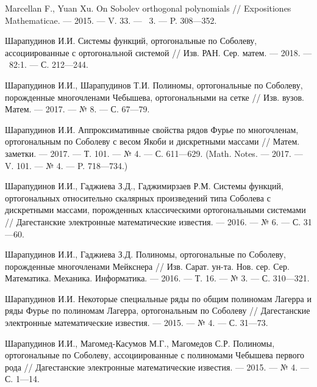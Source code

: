 ﻿\begin{thebibliography}{11}
Marcellan F., Yuan Xu. On Sobolev orthogonal polynomials // Expositiones Mathematicae. --- 2015. --- V. 33. --- \No\ 3. --- P. 308---352.



{Шарапудинов И.И.} Системы функций, ортогональные по Соболеву, ассоциированные с ортогональной системой // Изв. РАН. Сер. матем. --- 2018. --- \No\  82:1. --- С. 212---244.



Шарапудинов И.И., Шарапудинов Т.И. Полиномы, ортогональные по Соболеву, порожденные многочленами Чебышева, ортогональными на сетке // Изв. вузов. Матем. --- 2017. --- № 8. --- С. 67---79.



Шарапудинов И.И. Аппроксимативные свойства рядов Фурье по многочленам, ортогональным по Соболеву с весом Якоби и дискретными массами // Матем. заметки. --- 2017. --- Т. 101. --- № 4. --- С. 611---629. (Math. Notes. --- 2017. --- V. 101. --- № 4. --- P. 718---734.)



Шарапудинов И.И., Гаджиева З.Д., Гаджимирзаев Р.М. Системы функций, ортогональных относительно скалярных произведений типа Соболева с дискретными массами, порожденных классическими ортогональными системами // Дагестанские электронные математические известия. --- 2016. --- № 6. --- С. 31---60.



Шарапудинов И.И., Гаджиева З.Д. Полиномы, ортогональные по Соболеву, порожденные многочленами Мейкснера // Изв. Сарат. ун-та. Нов. сер. Сер. Математика. Механика. Информатика. --- 2016. --- Т. 16. --- № 3. --- С. 310---321.



Шарапудинов И.И. Некоторые специальные ряды по общим полиномам Лагерра и ряды Фурье по полиномам Лагерра, ортогональным по Соболеву // Дагестанские электронные математические известия. --- 2015. --- № 4. --- С. 31---73.



Шарапудинов И.И., Магомед-Касумов М.Г., Магомедов С.Р. Полиномы, ортогональные по Соболеву, ассоциированные с полиномами Чебышева первого рода // Дагестанские электронные математические известия. --- 2015. --- № 4. --- С. 1---14.




\end{thebibliography}
